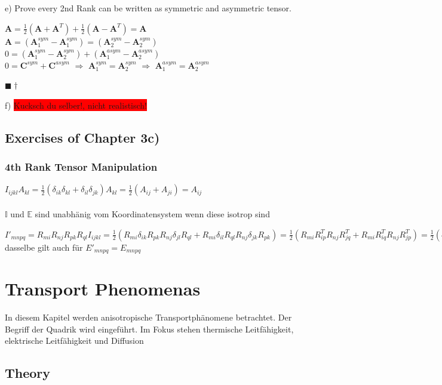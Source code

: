 \documentclass[a4paper, 10pt]{scrartcl}
\newcommand{\qed}{\begin{flushright}
		$\blacksquare \dagger$ \end{flushright}}
\begin{document}
e) Prove every 2nd Rank can be written as symmetric and asymmetric tensor.

$\mathbf{A}=\frac{1}{2}\left(\mathbf{A} + \mathbf{A}^T\right)+
\frac{1}{2}\left(\mathbf{A}-\mathbf{A}^T\right) = \mathbf{A}$ \\
$\mathbf{A}=\left(\mathbf{A}_1^{sym}-\mathbf{A}_1^{sym}\right)=\left(\mathbf{A}_2^{sym}-\mathbf{A}_2^{sym}\right)$
\\
$0=\left(\mathbf{A}_1^{sym}-\mathbf{A}_2^{sym}\right)+\left(\mathbf{A}_1^{asym}-\mathbf{A}_2^{asym}\right)$
\\
$0=\mathbf{C}^{sym}+\mathbf{C}^{asym}$ $\Rightarrow$
$\mathbf{A}_1^{sym}=\mathbf{A}_2^{sym}$ $\Rightarrow$
$\mathbf{A}_1^{asym}=\mathbf{A}_2^{asym}$ \qed


f) \colorbox{red}{Kucksch du selber!, nicht realistisch!}




\subsection{Exercises of Chapter 3c)}

\subsubsection{4th Rank Tensor Manipulation}


$I_{ijkl}A_{kl}=\frac{1}{2}(\delta_{ik}\delta_{kl}+\delta_{il}\delta_{jk})A_{kl}=\frac{1}{2}(A_{ij}+A_{ji})=A_{ij}$
\\
\\
$ \mathbb{I} $ und $ \mathbb{E} $ sind unabhänig vom Koordinatensystem wenn diese isotrop sind

$ I'_{mnpq}=R_{mi}R_{nj}R_{pk}R_{ql}I_{ijkl} = \frac{1}{2}(R_{mi}\delta_{ik}R_{pk}R_{nj}\delta_{jl}R_{ql} + R_{mi}\delta_{il}R_{ql}R_{nj}\delta_{jk}R_{pk})= \frac{1}{2}(R_{mi}R^T_{ip}R_{nj}R^T_{jq}+R_{mi}R^T_{iq}R_{nj}R^T_{jp})= \frac{1}{2}(\delta_{mp}\delta_{mq}\delta_{np})=I_{mnpq} $ dasselbe gilt auch für $ E'_{mnpq}=E_{mnpq}$



\section{Transport Phenomenas}
In diesem Kapitel werden anisotropische Transportphänomene betrachtet. Der
Begriff der Quadrik wird eingeführt. Im Fokus stehen thermische Leitfähigkeit,
elektrische Leitfähigkeit und Diffusion
\subsection{Theory}
\end{document}
